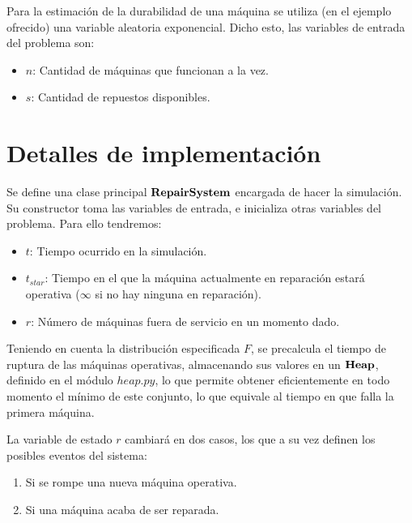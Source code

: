 \documentclass[12pt]{article}
\begin{document}
Para la estimación de la durabilidad de una máquina se utiliza (en el ejemplo ofrecido) una
variable aleatoria exponencial. Dicho esto, las variables de entrada del problema son:
  \begin{itemize}
    \item $n$: Cantidad de máquinas que funcionan a la vez.
    \item $s$: Cantidad de repuestos disponibles.
  \end{itemize}

\clearpage



\section{Detalles de implementación}
Se define una clase principal $\bold{RepairSystem}$ encargada de hacer la simulación.
Su constructor toma las variables de entrada, e inicializa otras variables del problema.
Para ello tendremos:
\begin{itemize}
  \item $t$: Tiempo ocurrido en la simulación.
  \item $t_{star}$: Tiempo en el que la máquina actualmente en reparación estará operativa ($\infty$ si no hay ninguna en reparación).
  \item $r$: Número de máquinas fuera de servicio en un momento dado.
\end{itemize}
Teniendo en cuenta la distribución especificada $F$, se precalcula el tiempo de ruptura de las máquinas
operativas, almacenando sus valores en un $\bold{Heap}$, definido en el módulo $heap.py$, lo que permite obtener
eficientemente en todo momento el mínimo de este conjunto, lo que equivale al tiempo en que falla la primera
máquina.

La variable de estado $r$ cambiará en dos casos, los que a su vez definen los posibles eventos del sistema:
\begin{enumerate}
  \item Si se rompe una nueva máquina operativa.
  \item Si una máquina acaba de ser reparada.
\end{enumerate}
\end{document}
